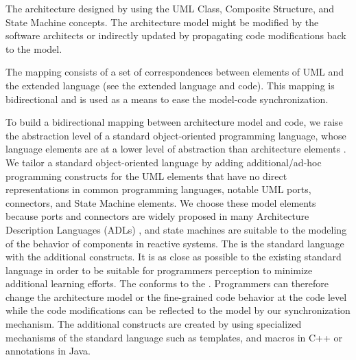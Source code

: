 \noindent
{}
The architecture designed by using the UML Class, Composite Structure, and State Machine concepts. 
The architecture model might be modified by the software architects or indirectly updated by propagating code modifications back to the model.

\noindent
{}
The mapping consists of a set of correspondences \cite{Brambilla:2012:MSE:2432361} between elements of UML and the extended language (see the extended language and code). 
This mapping is bidirectional and is used as a means to ease the model-code synchronization.

\noindent
{}
To build a bidirectional mapping between architecture model and code, we raise the abstraction level of a standard object-oriented programming language, whose language elements are at a lower level of abstraction than architecture elements \cite{DeSilva2012}. 
We tailor a standard object-oriented language by adding additional/ad-hoc programming constructs for the UML elements that have no direct representations in common programming languages, notable UML ports, connectors, and State Machine elements.
We choose these model elements because ports and connectors are widely proposed in many Architecture Description Languages (ADLs) \cite{Allen:1997:FBA:258077.258078}, and state machines are suitable to the modeling of the behavior of components in reactive systems.
The  is the standard language with the additional constructs.
It is as close as possible to the existing standard language in order to be suitable for programmers perception to minimize additional learning efforts.
The  conforms to the . 
Programmers can therefore change the architecture model or the fine-grained code behavior at the code level while the code modifications can be reflected to the model by our synchronization mechanism. 
The additional constructs are created by using specialized mechanisms of the standard language such as templates, and macros in C++ or annotations in Java.
